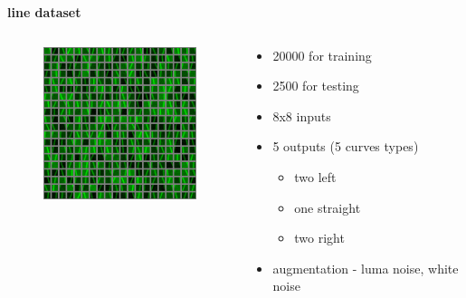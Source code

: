 \documentclass[xcolor=dvipsnames]{beamer}
\begin{document}
\begin{frame}{\bf line dataset}


\begin{columns}

\begin{column}{0.5\textwidth}

    \begin{figure}
        \includegraphics[scale=0.9]{../images/line_follower_dataset.png}
    \end{figure}

\end{column}



\begin{column}{0.5\textwidth}  %
{\small
    \begin{itemize}
        \item 20000 for training
        \item 2500 for testing
        \item 8x8 inputs
        \item 5 outputs (5 curves types)
            \begin{itemize}
                \item two left
                \item one straight
                \item two right
            \end{itemize}
        \item augmentation - luma noise, white noise

    \end{itemize}
}
\end{column}

\end{columns}



\end{frame}
\end{document}

